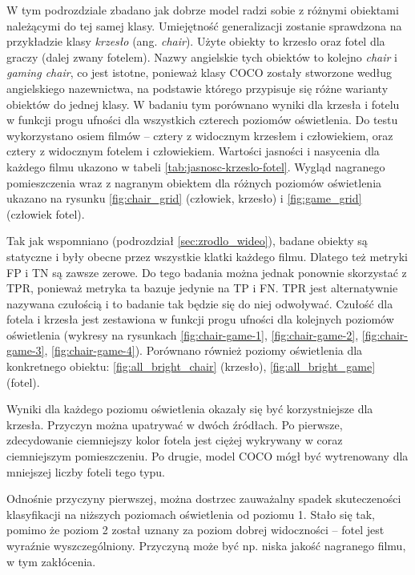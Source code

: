 W tym podrozdziale zbadano jak dobrze model radzi sobie z różnymi obiektami należącymi do tej samej klasy. Umiejętność generalizacji zostanie sprawdzona na przykładzie klasy \emph{krzesło} (ang. \emph{chair}). Użyte obiekty to krzesło oraz fotel dla graczy (dalej zwany fotelem). Nazwy angielskie tych obiektów to kolejno \emph{chair} i \emph{gaming chair}, co jest istotne, ponieważ klasy COCO zostały stworzone według angielskiego nazewnictwa, na podstawie którego przypisuje się różne warianty obiektów do jednej klasy. W badaniu tym porównano wyniki dla krzesła i fotelu w funkcji progu ufności dla wszystkich czterech poziomów oświetlenia. Do testu wykorzystano osiem filmów -- cztery z widocznym krzesłem i człowiekiem, oraz cztery z widocznym fotelem i człowiekiem. Wartości jasności i nasycenia dla każdego filmu ukazono w tabeli \ref{tab:jasnosc-krzeslo-fotel}. Wygląd nagranego pomieszczenia wraz z nagranym obiektem dla różnych poziomów oświetlenia ukazano na rysunku \ref{fig:chair_grid} (człowiek, krzesło) i 
\ref{fig:game_grid} (człowiek fotel). 


Tak jak wspomniano (podrozdział \ref{sec:zrodlo_wideo}), badane obiekty są statyczne i były obecne przez wszystkie klatki każdego filmu. Dlatego też metryki FP i TN są zawsze zerowe. Do tego badania można jednak ponownie skorzystać z TPR, ponieważ metryka ta bazuje jedynie na TP i FN. TPR jest alternatywnie nazywana czułością i to badanie tak będzie się do niej odwoływać. Czułość dla fotela i krzesła jest zestawiona w funkcji progu ufności dla kolejnych poziomów oświetlenia (wykresy na rysunkach \ref{fig:chair-game-1}, \ref{fig:chair-game-2}, \ref{fig:chair-game-3}, \ref{fig:chair-game-4}). Porównano również poziomy oświetlenia dla konkretnego obiektu: \ref{fig:all_bright_chair} (krzesło), \ref{fig:all_bright_game} (fotel). 

Wyniki dla każdego poziomu oświetlenia okazały się być korzystniejsze dla krzesła. Przyczyn można upatrywać w dwóch źródłach. Po pierwsze, zdecydowanie ciemniejszy kolor fotela jest ciężej wykrywany w coraz ciemniejszym pomieszczeniu. Po drugie, model COCO mógł być wytrenowany dla mniejszej liczby foteli tego typu.

Odnośnie przyczyny pierwszej, można dostrzec zauważalny spadek skuteczeności klasyfikacji na niższych poziomach oświetlenia od poziomu 1. Stało się tak, pomimo że poziom 2 został uznany za poziom dobrej widoczności -- fotel jest wyraźnie wyszczególniony. Przyczyną może być np. niska jakość nagranego filmu, w tym zakłócenia. 

